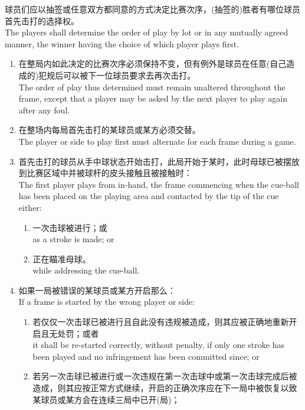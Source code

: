 \noindent 球员们应以抽签或任意双方都同意的方式决定比赛次序，(抽签的)胜者有哪位球员首先击打的选择权。\\
The players shall determine the order of play by lot or in any mutually agreed manner, the winner having the choice of which player plays first.
\begin{enumerate}[label=(\alph*)]
    \item 在整局内如此决定的比赛次序必须保持不变，但有例外是球员在任意(自己造成的)犯规后可以被下一位球员要求去再次击打。\\
    The order of play thus determined must remain unaltered throughout the frame, except that a player may be asked by the next player to play again after any foul.
    \item 在整场内每局首先击打的某球员或某方必须交替。\\
    The player or side to play first must alternate for each frame during a game.
    \item \label{2233c}首先击打的球员从手中球状态开始击打，此局开始于某时，此时母球已被摆放到比赛区域中并被球杆的皮头接触且被接触时：\\
    The first player plays from in-hand, the frame commencing when the cue-ball has been placed on the playing area and contacted by the tip of the cue either:
    \begin{enumerate}[label=(\roman*)]
        \item 一次击球被进行；或\\
        as a stroke is made; or
        \item 正在瞄准母球。\\
        while addressing the cue-ball.
    \end{enumerate}
    \item \label{2233d}如果一局被错误的某球员或某方开启那么：\\
    If a frame is started by the wrong player or side:
    \begin{enumerate}[label=(\roman*)]
        \item 若仅仅一次击球已被进行且自此没有违规被造成，则其应被正确地重新开启且无处罚；或者\\
        it shall be re-started correctly, without penalty, if only one stroke has been played and no infringement has been committed since; or
        \item 若另一次击球已被进行或一次违规在第一次击球中或第一次击球完成后被造成，则其应按正常方式继续，开启的正确次序应在下一局中被恢复以致某球员或某方会在连续三局中已开(局)；\\

\end{enumerate}
\end{enumerate}
